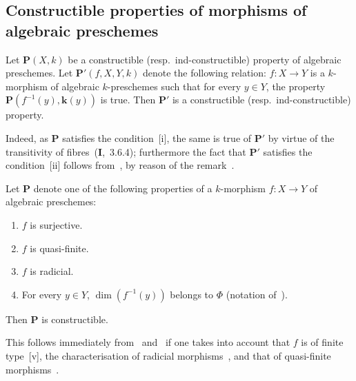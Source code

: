 \subsection{Constructible properties of morphisms of algebraic preschemes}
\label{subsection:IV.9.3}

\begin{proposition}[9.3.1]
\label{IV.9.3.1}
Let $\mathbf{P}(X,k)$ be a constructible \textnormal{(}resp.\ ind-constructible\textnormal{)} property of algebraic preschemes.
Let $\mathbf{P}'(f,X,Y,k)$ denote the following relation: $f:X\to Y$ is a $k$-morphism of algebraic $k$-preschemes such that for every $y\in Y$, the property $\mathbf{P}(f^{-1}(y),\mathbf{k}(y))$ is true.
Then $\mathbf{P}'$ is a constructible \textnormal{(}resp.\ ind-constructible\textnormal{)} property.
\end{proposition}

Indeed, as $\mathbf{P}$ satisfies the condition~[i], the same is true of $\mathbf{P}'$ by virtue of the transitivity of fibres~(\textbf{I},~3.6.4); furthermore the fact that $\mathbf{P}'$ satisfies the condition~[ii] follows from~, by reason of the remark~.

\begin{proposition}[9.3.2]
\label{IV.9.3.2}
Let $\mathbf{P}$ denote one of the following properties of a $k$-morphism $f:X\to Y$ of algebraic preschemes:
\begin{enumerate}[label=(\roman*)]
  \item $f$ is surjective.
  \item $f$ is quasi-finite.
  \item $f$ is radicial.
  \item For every $y\in Y$, $\dim(f^{-1}(y))$ belongs to $\Phi$ \textnormal{(}notation of~\textnormal{)}.
\end{enumerate}
Then $\mathbf{P}$ is constructible.
\end{proposition}

This follows immediately from~ and~ if one takes into account that $f$ is of finite type~[v], the characterisation of radicial morphisms~, and that of quasi-finite morphisms~.

